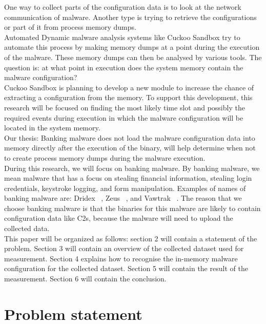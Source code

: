 \documentclass[conference]{IEEEtran}
\begin{document}
One way to collect parts of the configuration data is to look at the network communication of malware. Another type is trying to retrieve the configurations or part of it from process memory dumps.\\

Automated Dynamic malware analysis systems like Cuckoo Sandbox try to automate this process by making memory dumps at a point during the execution of the malware. These memory dumps can then be analysed by various tools. The question is: at what point in execution does the system memory contain the malware configuration?\\

Cuckoo Sandbox is planning to develop a new module to increase the chance of extracting a configuration from the memory. To support this development, this research will be focused on finding the most likely time slot and  possibly  the required events during execution in which the malware configuration will be located in the system memory.\\
Our thesis: Banking malware does not load the malware configuration data into memory directly after the execution of the binary, will help determine when not to create process memory dumps during the malware execution.\\

During this research, we will focus on banking malware. By banking malware, we mean malware that has a focus on stealing financial information, stealing login credentials, keystroke logging, and form manipulation. Examples of names of banking malware are: Dridex ~\cite{briendridex}, Zeus ~\cite{wykezeus}, and Vawtrak ~\cite{krousvawtrak}. The reason that we choose banking malware is that the binaries  for this malware are likely to contain configuration data like C2s, because the malware will need to upload the collected data.\\

This paper will be organized as follows:  section 2 will contain a statement of the problem. Section 3 will contain an overview of the collected dataset  used for measurement. Section 4 explains how to recognise the in-memory malware configuration for the collected dataset. Section 5 will contain the result of the measurement. Section 6 will contain the conclusion.\\

\section{Problem statement}
\end{document}
